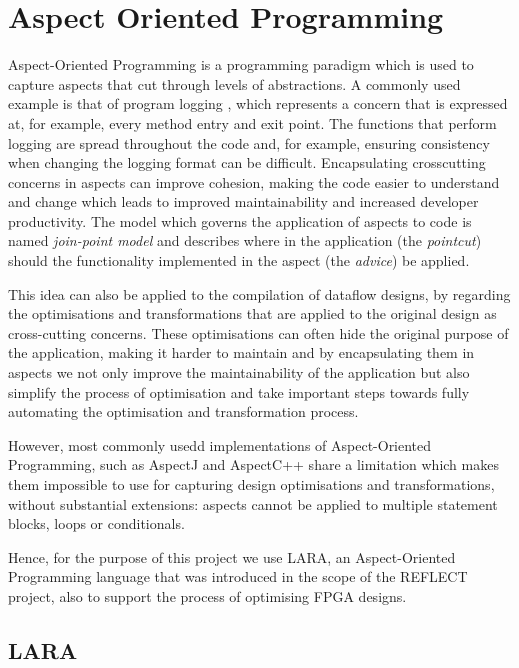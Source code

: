 \section{Aspect Oriented Programming}

Aspect-Oriented Programming \cite{Kiczales:2005:AP:1062455.1062640} is
a programming paradigm which is used to capture aspects that cut
through levels of abstractions. A commonly used example is that of
program logging \cite{jacobson2004aspect}, which represents a concern
that is expressed at, for example, every method entry and exit
point. The functions that perform logging are spread throughout the
code and, for example, ensuring consistency when changing the logging
format can be difficult. Encapsulating crosscutting concerns in
aspects can improve cohesion, making the code easier to understand and
change which leads to improved maintainability and increased developer
productivity. The model which governs the application of aspects to
code is named \emph{join-point model} and describes where in the
application (the \emph{pointcut}) should the functionality implemented
in the aspect (the \emph{advice}) be applied.

This idea can also be applied to the compilation of dataflow designs,
by regarding the optimisations and transformations that are applied to
the original design as cross-cutting concerns. These optimisations can
often hide the original purpose of the application, making it harder
to maintain and by encapsulating them in aspects we not only improve
the maintainability of the application but also simplify the process
of optimisation and take important steps towards fully automating the
optimisation and transformation process.

However, most commonly usedd implementations of Aspect-Oriented
Programming, such as AspectJ \cite{Gradecki:Lesiecki:2003,
  Kiczales:2001} and AspectC++\cite{Spinczyk:Gal:Schroder:2002} share
a limitation which makes them impossible to use for capturing design
optimisations and transformations, without substantial extensions:
aspects cannot be applied to multiple statement blocks, loops or
conditionals.

Hence, for the purpose of this project we use LARA, an Aspect-Oriented
Programming language that was introduced in the scope of the
REFLECT\cite{Cardoso:Bertels:Kuzmanov:Nane:Sima:2011} project, also to
support the process of optimising FPGA designs.

\subsection{LARA}

